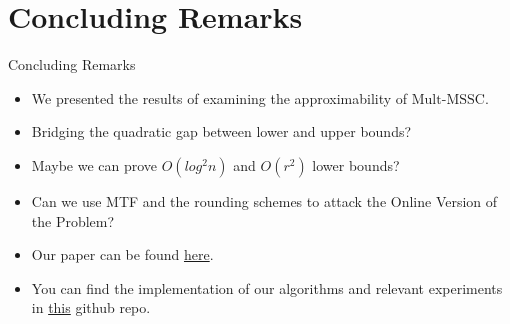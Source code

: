 \documentclass{beamer}
\def\DSSC{\mathrm{Mult}\text{-}\mathrm{MSSC}}
\begin{document}
\section{Concluding Remarks}

\begin{frame}{Concluding Remarks}
    \begin{itemize}
         \item We presented the results of \cite{fotakis_et_al:LIPIcs.ICALP.2021.65} examining the approximability of $\DSSC$.
         \item Bridging the quadratic gap between lower and upper bounds?
         \item Maybe we can prove $O(log^2n)$ and $O(r^2)$ lower bounds?
         \item Can we use MTF and the rounding schemes to attack the Online Version of the Problem?
         \item Our paper can be found \href{https://drops.dagstuhl.de/opus/volltexte/2021/14134/}{here}.
         \item You can find the implementation of our algorithms and relevant experiments in \href{https://github.com/infinity4471/Dynamic-Min-Sum-Set-Cover}{this} github repo.
    \end{itemize}
\end{frame}

\end{document}
